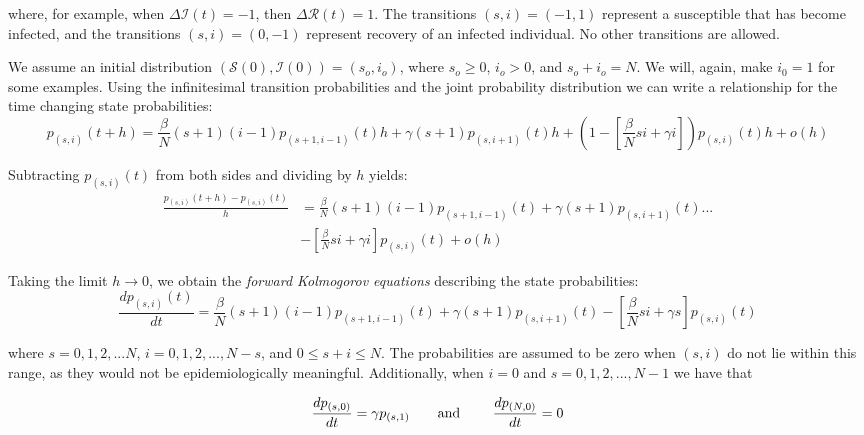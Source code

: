 \documentclass[reqno,11pt]{amsart}
\newcommand{\tab}{\hspace*{2em}}
\begin{document}
where, for example, when $ \Delta \mathcal I(t) = -1 $, then $ \Delta \mathcal R(t) = 1 $. The transitions $(s,i) = (-1,1)$ represent a susceptible that has become infected, and the transitions $(s,i) = (0, -1)$ represent recovery of an infected individual. No other transitions are allowed.

We assume an initial distribution $(\mathcal S(0), \mathcal I(0)) = (s_o,i_o)$, where $s_o \ge 0$, $i_o > 0$, and $s_o+i_o=N$. We will, again, make $i_0=1$ for some examples. Using the infinitesimal transition probabilities and the joint probability distribution we can write a relationship for the time changing state probabilities:
\begin{equation*}
p_{ (s,i) } (t+h) = \frac{ \beta }{N} (s+1) (i-1) p_{ (s+1,i-1) } (t) h+ \gamma (s+1) p_{ (s,i+1) } (t) h + \left ( 1 - \left [ \frac{ \beta }{N} s i + \gamma i \right ] \right ) p_{ (s,i) } (t)  h + o(h)
\end{equation*}

Subtracting $p_{(s,i)} (t)$ from both sides and dividing by $h$ yields:
\begin{equation*}
\begin{split}
\frac{p_{(s,i)} (t+h) - p_{(s,i)} (t) }{h} &= \frac{\beta}{N} (s+1) (i-1) p_{ (s+1,i-1) } (t) + \gamma (s+1) p_{ (s,i+1) } (t) ... \\ & - \left [ \frac{ \beta }{N} s i + \gamma i \right ] p_{ (s,i) } (t)  + o(h)
\end{split}
\end{equation*}

Taking the limit $h \rightarrow 0$, we obtain the \textit{forward Kolmogorov equations} describing the state probabilities:
\begin{equation}\label{Eq_Kolmogorov}
\frac{dp_{(s,i)} (t)}{dt} = \frac{\beta}{N} (s+1)(i-1) p_{(s+1,i-1)} (t) + \gamma (s+1) p_{(s,i+1)} (t) - \left[ \frac{\beta}{N}s i  + \gamma s \right] p_{(s,i)} (t)
\end{equation}

where $ s = 0, 1, 2 ,...N$, $ i = 0, 1, 2,...,N-s $, and $ 0 \le s+i \le N$. The probabilities are assumed to be zero when $(s,i)$ do not lie within this range, as they would not be epidemiologically meaningful. Additionally, when $ i=0$ and $ s = 0,1,2,...,N-1$ we have that

\begin{equation*}
\frac{dp_{(s,0)}}{dt} = \gamma p_{(s,1)}      \text{\tab and \tab} 	\frac{dp_{(N,0)} } {dt} = 0
\end{equation*}
\end{document}
